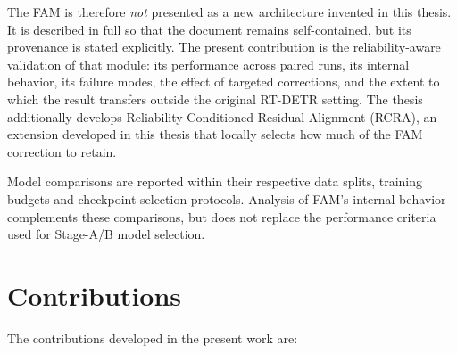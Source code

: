 The FAM is therefore \emph{not} presented as a new architecture invented in
this thesis. It is described in full so that the document remains
self-contained, but its provenance is stated explicitly. The present
contribution is the reliability-aware validation of that module: its
performance across paired runs, its internal behavior, its failure modes, the
effect of targeted corrections, and the extent to which the result transfers
outside the original RT-DETR setting. The thesis additionally develops
Reliability-Conditioned Residual Alignment (RCRA), an extension developed in
this thesis that locally selects how much of the FAM correction to retain.

Model comparisons are reported within their respective data splits, training
budgets and checkpoint-selection protocols. Analysis of FAM's internal
behavior complements these comparisons, but does not replace the performance
criteria used for Stage-A/B model selection.

\section{Contributions}

The contributions developed in the present work are:


